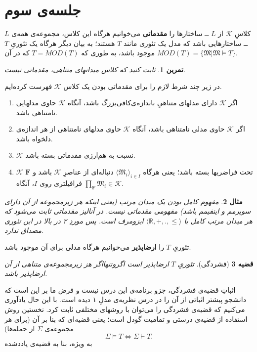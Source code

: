 \documentclass[12pt,a4paper]{article}
\theoremstyle{colorhead}
\newtheorem{thm}{قضیه}
\newtheorem{tam}[thm]{تمرین}
\newtheorem{mesal}[thm]{مثال}
\begin{document}
\section{جلسه‌ی سوم}
کلاسِ
$\mathcal{K}$
از
$L$ ــ
ساختارها را 
\textbf{مقدماتی}
 می‌خوانیم هرگاه این کلاس، مجموعه‌ی همه‌ی
$L$ ــ
ساختارهایی باشد که  مدل یک تئوری مانند
$T$
هستند؛ به بیان دیگر هرگاه یک تئوریِ 
$T$
موجود باشد، به طوری که
$T=MOD(T)$
که 
در آن
$MOD(T)=\{\mathfrak{M}|\mathfrak{M}\models T\}$.
\begin{tam}
ثابت کنید که کلاس میدانهای متناهی، مقدماتی نیست.
\end{tam}
در زیر چند شرط لازم را برای مقدماتی بودن یک کلاس
$\mathcal{K}$
فهرست کرده‌ایم.
\begin{enumerate}
\item 
اگر
$\mathcal{K}$
دارای 
مدلهای متناهیِ‌ باندازه‌ی‌کافی‌بزرگ باشد، آنگاه
$\mathcal{K}$
حاوی مدلهایی نامتناهی باشد.
\item 
اگر
$\mathcal{K}$
حاوی 
مدلی نامتناهی باشد، آنگاه
$\mathcal{K}$
حاوی مدلهای نامتناهی از هر اندازه‌ی دلخواه باشد.
\item
$\mathcal{K}$
نسبت به هم‌ارزی مقدماتی بسته باشد.
\item 
$\mathcal{K}$
تحت فراضربها بسته باشد؛ یعنی هرگاه
$\langle \mathfrak{M}_i\rangle_{i\in I}$
دنباله‌ای از عناصرِ
$\mathcal{K}$
باشد و 
$\mathbf{F}$
فرافیلتری
روی
$I$،
آنگاه
$\prod_\mathbf{F}\mathfrak{M}_i\in \mathcal{K}$.
\end{enumerate}
\begin{mesal}
مفهوم کامل بودن یک میدان مرتب (یعنی اینکه هر زیرمجموعه‌ از آن دارای سوپرمم و اینفیمم باشد)‌ مفهومی مقدماتی نیست. در آنالیز مقدماتی ثابت می‌شود
که هر میدان مرتب کامل با
$\langle \mathbb{R},+,.,\leq\rangle$
ایزومرف است. پس موردِ ۲ در بالا 
در این تئوری مصداق ندارد.
\end{mesal}
تئوریِ
$T$
 را 
\textbf{ ارضاپذیر }
 می‌خوانیم هرگاه مدلی برای آن موجود باشد.
\begin{thm}[فشردگی]
تئوریِ
$T$
ارضاپذیر است اگروتنهااگر
هز زیرمجموعه‌ی متناهی از آن ارضاپذیر باشد. 
\end{thm}
اثباتِ قضیه‌ی فشردگی، جزو برنامه‌ی این درس نیست و فرض ما بر این است که دانشجو پیشتر اثباتی از آن را در درس نظریه‌ی مدلِ ۱ دیده است. با این حال یادآوری می‌کنیم
که قضیه‌ی فشردگی را می‌توان با روشهای مختلفی ثابت کرد. نخستین روش استفاده از قضیه‌ی درستی و تمامیت گودل است؛ یعنی قضیه‌ای که بنا بر آن (برای هر مجموعه‌ی
$\Sigma$
از جمله‌ها)
\[
\Sigma \models T \Leftrightarrow \Sigma\vdash T.
\]
به ویژه، بنا به قضیه‌ی یاددشده
\end{document}

